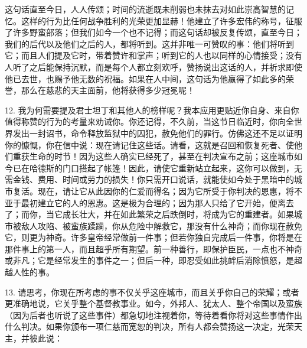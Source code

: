 这句话直至今日，人人传颂；时间的流逝既未削弱也未抹去对如此崇高智慧的记忆。这样的行为比任何战争胜利的光荣更加显赫！他建立了许多宏伟的称号，征服了许多野蛮部落；但我们如今一个也不记得；而这句话却被反复传颂，直至今日；我们的后代以及他们之后的人，都将听到。这并非唯一可赞叹的事：他们将听到它；而且人们提及它时，带着赞许和掌声；听到它的人也以同样的心情接受；没有人听了之后能保持沉默，而是每个人都立刻欢呼，赞扬说出这话的人，并祈求即使他已去世，也赐予他无数的祝福。如果在人中间，这句话为他赢得了如此多的荣誉，那么在慈悲的天主面前，他将获得多少冠冕呢！\par

12. 我为何需要提及君士坦丁和其他人的榜样呢？我本应用更贴近你自身、来自你值得称赞的行为的考量来劝诫你。你还记得，不久前，当这节日临近时，你向全世界发出一封诏书，命令释放监狱中的囚犯，赦免他们的罪行。仿佛这还不足以证明你的慷慨，你在信中说：现在请记住这些话。请看，这就是召回和恢复死者、使他们重获生命的时节！因为这些人确实已经死了，甚至在判决宣布之前；这座城市如今已在哈德斯的门口搭起了帐篷！因此，请使它重新站立起来，这你可以做到，无需金钱、费用、时间或劳力的损失！你只需开口说话，就能使如今处于黑暗中的城市复活。现在，请让它从此因你的仁爱而得名；因为它所受于你判决的恩惠，将不亚于最初建立它的人的恩惠。这是极为合理的；因为那人只给了它开始，便离去了；而你，当它成长壮大，并在如此繁荣之后跌倒时，将成为它的重建者。如果城市被敌人攻陷、被蛮族蹂躏，你从危险中解救它，那没有什么神奇；而你现在赦免它，则更为神奇。许多皇帝经常做前一件事；但若你独自完成后一件事，你将是在那件事上的第一人，而且超乎所有期望。前一种善行，即保护臣民，一点也不神奇或非凡；它是经常发生的事件之一；但后一种，即忍受如此挑衅后消除愤怒，是超越人性的事。\par

13. 请思考，你现在所考虑的事不仅关乎这座城市，而且关乎你自己的荣耀；或者更准确地说，它关乎整个基督教事业。如今，外邦人、犹太人、整个帝国以及蛮族（因为后者也听说了这些事件）都急切地注视着你，等待着看你将对这些事情作出什么判决。如果你颁布一项仁慈而宽恕的判决，所有人都会赞扬这一决定，光荣天主，并彼此说：\par

